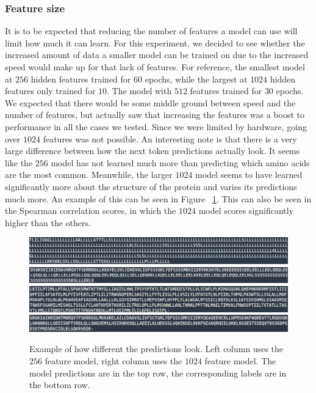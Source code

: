 \subsubsection{Feature size}
It is to be expected that reducing the number of features a model can use will limit how much it can learn. For this experiment, we decided to see whether the increased amount of data a smaller model can be trained on due to the increased speed would make up for that lack of features. For reference, the smallest model at $256$ hidden features trained for $60$ epochs, while the largest at $1024$ hidden features only trained for $10$. The model with $512$ features trained for $30$ epochs. We expected that there would be some middle ground between speed and the number of features, but actually saw that increasing the features was a boost to performance in all the cases we tested. Since we were limited by hardware, going over $1024$ features was not possible. An interesting note is that there is a very large difference between how the next token predictions actually look. It seems like the $256$ model has not learned much more than predicting which amino acids are the most common. Meanwhile, the larger $1024$ model seems to have learned significantly more about the structure of the protein and varies its predictions much more. An example of this can be seen in Figure ~\ref{fig:predictions}. This can also be seen in the Spearman correlation scores, in which the $1024$ model scores significantly higher than the others.


\begin{figure}[!ht]
  \centering
  \includegraphics[width=0.49\linewidth]{latex/imgs/256_prediction.png}
  \includegraphics[width=0.49\linewidth]{latex/imgs/1024_prediction.png}
  \includegraphics[width=0.49\linewidth]{latex/imgs/256_labels.png}
  \includegraphics[width=0.49\linewidth]{latex/imgs/1024_labels.png}
  \caption{Example of how different the predictions look. Left column uses the $256$ feature model, right column uses the $1024$ feature model. The model predictions are in the top row, the corresponding labels are in the bottom row.}
  \label{fig:predictions}
\end{figure}

